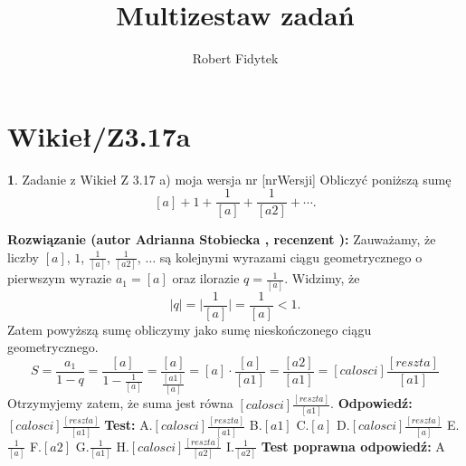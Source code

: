 \documentclass[12pt, a4paper]{article}
\title{Multizestaw zadań}
\author{Robert Fidytek}
\date{}
\theoremstyle{definition} %
\newtheorem{zad}{}
\newcommand{\kategoria}[1]{\section{#1}} %
\newcommand{\zadStart}[1]{\begin{zad}#1\newline} %
\newcommand{\zadStop}{\end{zad}}   %
\newcommand{\rozwStart}[2]{\noindent \textbf{Rozwiązanie (autor #1 , recenzent #2): }\newline} %
\newcommand{\rozwStop}{\newline}                                            %
\newcommand{\odpStart}{\noindent \textbf{Odpowiedź:}\newline}    %
\newcommand{\odpStop}{\newline}                                             %
\newcommand{\testStart}{\noindent \textbf{Test:}\newline} %
\newcommand{\testStop}{\newline} %
\newcommand{\kluczStart}{\noindent \textbf{Test poprawna odpowiedź:}\newline} %
\newcommand{\kluczStop}{\newline} %
\begin{document}
\maketitle


\kategoria{Wikieł/Z3.17a}
\zadStart{Zadanie z Wikieł Z 3.17 a) moja wersja nr [nrWersji]}
Obliczyć poniższą sumę
$$[a]+1+\frac{1}{[a]}+\frac{1}{[a2]}+\cdots.$$
\zadStop
\rozwStart{Adrianna Stobiecka}{}
Zauważamy, że liczby $[a]$, $1$, $\frac{1}{[a]}$, $\frac{1}{[a2]}$, $\dots$ są kolejnymi wyrazami ciągu geometrycznego o pierwszym wyrazie $a_1=[a]$ oraz ilorazie $q=\frac{1}{[a]}$. Widzimy, że 
$$|q|=\bigg|\frac{1}{[a]}\bigg|=\frac{1}{[a]}<1.$$
Zatem powyższą sumę obliczymy jako sumę nieskończonego ciągu geometrycznego.
$$S=\frac{a_1}{1-q}=\frac{[a]}{1-\frac{1}{[a]}}=\frac{[a]}{\frac{[a1]}{[a]}}=[a]\cdot\frac{[a]}{[a1]}=\frac{[a2]}{[a1]}=[calosci]\frac{[reszta]}{[a1]}$$
Otrzymyjemy zatem, że suma jest równa $[calosci]\frac{[reszta]}{[a1]}$.
\rozwStop
\odpStart
$[calosci]\frac{[reszta]}{[a1]}$
\odpStop
\testStart
A.$[calosci]\frac{[reszta]}{[a1]}$
B.$[a1]$
C.$[a]$
D.$[calosci]\frac{[reszta]}{[a]}$
E.$\frac{1}{[a]}$
F.$[a2]$
G.$\frac{1}{[a1]}$
H.$[calosci]\frac{[reszta]}{[a2]}$
I.$\frac{1}{[a2]}$
\testStop
\kluczStart
A
\kluczStop
\end{document}
